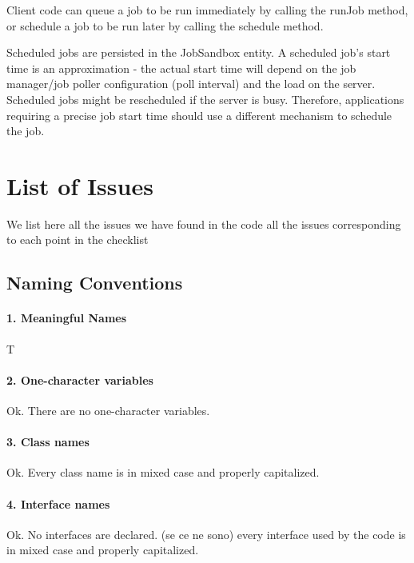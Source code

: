 \documentclass[english]{article}
\begin{document}
Client code can queue a job to be run immediately by calling the runJob method, or schedule a job to be run later by calling the schedule method. 

Scheduled jobs are persisted in the JobSandbox entity. A scheduled job's start time is an approximation - the actual start time will depend on the job manager/job poller configuration (poll interval) and the load on the server.
Scheduled jobs might be rescheduled if the server is busy. Therefore, applications requiring a precise job start time should use a different mechanism to schedule the job.

\section{List of Issues} %
We list here all the issues we have found in the code
all the issues corresponding to each point in the checklist


\subsection{Naming Conventions}

\paragraph{1. Meaningful Names}
T

\paragraph{2. One-character variables}

Ok.
There are no one-character variables.

\paragraph{3. Class names}
Ok.
Every class name is in mixed case and properly capitalized.

\paragraph{4. Interface names}
Ok.
No interfaces are declared.
(se ce ne sono) every interface used by the code is in mixed case and properly capitalized.
\end{document}
